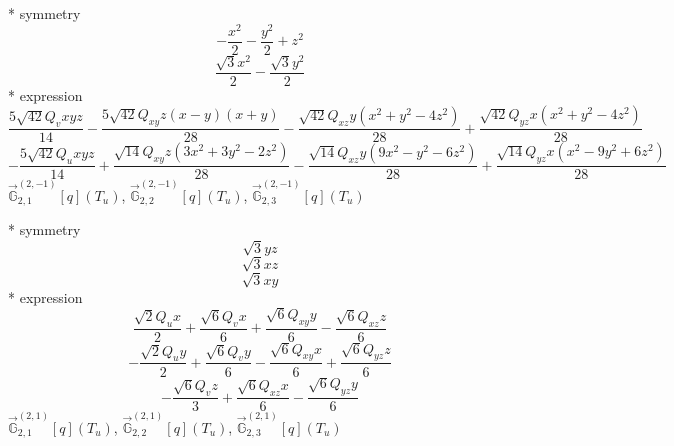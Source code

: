 \documentclass[fleqn,8pt]{jsarticle}
\begin{document}
\noindent\quad ** symmetry
\begin{dmath*}
- \frac{x^{2}}{2} - \frac{y^{2}}{2} + z^{2}
\end{dmath*}
\begin{dmath*}
\frac{\sqrt{3} x^{2}}{2} - \frac{\sqrt{3} y^{2}}{2}
\end{dmath*}
\noindent\quad ** expression
\begin{dmath*}
\frac{5 \sqrt{42} Q_{v} x y z}{14} - \frac{5 \sqrt{42} Q_{xy} z \left(x - y\right) \left(x + y\right)}{28} - \frac{\sqrt{42} Q_{xz} y \left(x^{2} + y^{2} - 4 z^{2}\right)}{28} + \frac{\sqrt{42} Q_{yz} x \left(x^{2} + y^{2} - 4 z^{2}\right)}{28}
\end{dmath*}
\begin{dmath*}
- \frac{5 \sqrt{42} Q_{u} x y z}{14} + \frac{\sqrt{14} Q_{xy} z \left(3 x^{2} + 3 y^{2} - 2 z^{2}\right)}{28} - \frac{\sqrt{14} Q_{xz} y \left(9 x^{2} - y^{2} - 6 z^{2}\right)}{28} + \frac{\sqrt{14} Q_{yz} x \left(x^{2} - 9 y^{2} + 6 z^{2}\right)}{28}
\end{dmath*}
\noindent\quad $\vec{\mathbb{G}}_{2,1}^{(2,-1)}[q](T_{u})$, $\vec{\mathbb{G}}_{2,2}^{(2,-1)}[q](T_{u})$, $\vec{\mathbb{G}}_{2,3}^{(2,-1)}[q](T_{u})$

\noindent\quad ** symmetry
\begin{dmath*}
\sqrt{3} y z
\end{dmath*}
\begin{dmath*}
\sqrt{3} x z
\end{dmath*}
\begin{dmath*}
\sqrt{3} x y
\end{dmath*}
\noindent\quad ** expression
\begin{dmath*}
\frac{\sqrt{2} Q_{u} x}{2} + \frac{\sqrt{6} Q_{v} x}{6} + \frac{\sqrt{6} Q_{xy} y}{6} - \frac{\sqrt{6} Q_{xz} z}{6}
\end{dmath*}
\begin{dmath*}
- \frac{\sqrt{2} Q_{u} y}{2} + \frac{\sqrt{6} Q_{v} y}{6} - \frac{\sqrt{6} Q_{xy} x}{6} + \frac{\sqrt{6} Q_{yz} z}{6}
\end{dmath*}
\begin{dmath*}
- \frac{\sqrt{6} Q_{v} z}{3} + \frac{\sqrt{6} Q_{xz} x}{6} - \frac{\sqrt{6} Q_{yz} y}{6}
\end{dmath*}
\noindent\quad $\vec{\mathbb{G}}_{2,1}^{(2,1)}[q](T_{u})$, $\vec{\mathbb{G}}_{2,2}^{(2,1)}[q](T_{u})$, $\vec{\mathbb{G}}_{2,3}^{(2,1)}[q](T_{u})$
\end{document}
